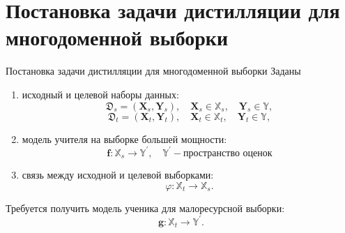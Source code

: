 \documentclass[10pt,pdf,hyperref={unicode}]{beamer}
\begin{document}
\section{Постановка задачи дистилляции для многодоменной выборки}
\begin{frame}{Постановка задачи дистилляции для многодоменной выборки}
Заданы
\begin{enumerate}[1)]
    \item исходный и целевой наборы данных:
    $$\mathfrak{D}_{s}=(\mathbf{X}_{s},\mathbf{Y}_{s}),
    \quad \mathbf{X}_{s} \in \mathbb{X}_{s},
    \quad \mathbf{Y}_{s} \in \mathbb{Y},$$
    $$\mathfrak{D}_{t}=(\mathbf{X}_{t},\mathbf{Y}_{t}),
    \quad \mathbf{X}_{t} \in \mathbb{X}_{t},
    \quad \mathbf{Y}_{t} \in \mathbb{Y},$$
    \item модель учителя на выборке большей мощности:
    $$\mathbf{f}: \mathbb{X}_{s} \rightarrow \mathbb{Y}^{\prime}, \quad \mathbb{Y}^{\prime} - \text{пространство оценок}$$
    \item связь между исходной и целевой выборками:
    $$\varphi: \mathbb{X}_{t} \rightarrow \mathbb{X}_{s}.$$
\end{enumerate}

\bigskip

Требуется получить модель ученика для малоресурсной выборки:
$$\mathbf{g}: \mathbb{X}_{t} \rightarrow \mathbb{Y}^{\prime}.$$

\end{frame}

\end{document}
